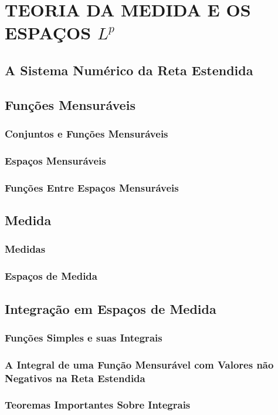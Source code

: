 \chapter{TEORIA DA MEDIDA E OS ESPAÇOS $L^p$}   
    \section{A Sistema Numérico da Reta Estendida}
    \section{Funções Mensuráveis}
        \subsection{Conjuntos e Funções Mensuráveis}
        \subsection{Espaços Mensuráveis}
        \subsection{Funções Entre Espaços Mensuráveis}
    \section{Medida}
        \subsection{Medidas}
        \subsection{Espaços de Medida}
    \section{Integração em Espaços de Medida}
        \subsection{Funções Simples e suas Integrais}
        \subsection{A Integral de uma Função Mensurável com Valores não Negativos na Reta Estendida}
        \subsection{Teoremas Importantes Sobre Integrais}
